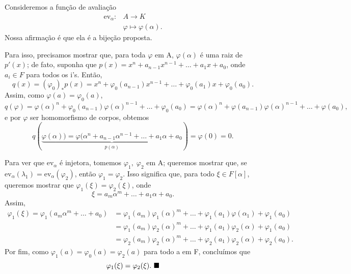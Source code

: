\documentclass[../algebraIII_notes.tex]{subfiles}
\begin{document}
\begin{proof*}
	Consideremos a função de avaliação
	\begin{align*}
		\mathrm{ev}_{\alpha }: & A\rightarrow K                        \\
		                       & \varphi \longmapsto \varphi(\alpha ).
	\end{align*}
	Nossa afirmação é que ela é a bijeção proposta.

	Para isso, precisamos mostrar que, para toda \(\varphi \) em A, \(\varphi(\alpha )\) é uma raiz de \(p'(x)\); de fato, suponha que \(p(x) = x^{n} + a_{n-1}x^{n-1}+\dotsc +a_1 x + a_{0}\), onde \(a_{i}\in F\) para todos os i's. Então,
	\[
		q(x) = (\varphi_{0})_{*}p(x) = x^{n} + \varphi_{0}(a_{n-1})x^{n-1}+\dotsc +\varphi_{0}(a_1)x + \varphi_{0}(a_{0}).
	\]
	Assim, como \(\varphi (a) = \varphi_{0}(a)\),
	\[
		q(\varphi)=\varphi(\alpha )^{n}+\varphi_{0}(a_{n-1})\varphi(\alpha)^{n-1}+\dotsc +\varphi_{0}(a_{0}) = \varphi(\alpha)^{n}+\varphi(a_{n-1})\varphi(\alpha)^{n-1}+\dotsc +\varphi(a_{0}),
	\]
	e por \(\varphi \) ser homomorfismo de corpos, obtemos
	\[
		q(\underbrace{\varphi (\alpha )) = \varphi (\alpha^{n}+a_{n-1}\alpha^{n-1}+\dotsc +a_{1}\alpha +a_{0}}_{p(\alpha )})=\varphi(0) = 0.
	\]

	Para ver que \(\mathrm{ev}_{\alpha }\) é injetora, tomemos \(\varphi_1,\; \varphi_2\) em A; queremos mostrar que, se \(\mathrm{ev}_{\alpha }(\lambda_1) = \mathrm{ev}_{\alpha }(\varphi_2)\), então \(\varphi_1 = \varphi_2\). Isso significa que, para todo \(\xi \in F[\alpha ]\), queremos mostrar que \(\varphi_1(\xi ) = \varphi_2(\xi )\), onde
	\[
		\xi = a_{m}\alpha^{m} + \dotsc +a_1 \alpha  + a_{0}.
	\]
	Assim,
	\begin{align*}
		\varphi_{1}(\xi ) = \varphi_{1}(a_{m}\alpha^{m}+\dotsc +a_{0}) & = \varphi_1(a_{m})\varphi_1(\alpha)^{m}+\dotsc +\varphi_1(a_1)\varphi(\alpha_1) + \varphi_1(a_{0}) \\
		                                                               & = \varphi_1(a_{m})\varphi_2(\alpha)^{m}+\dotsc + \varphi_1(a_1)\varphi_2(\alpha )+\varphi_1(a_{0}) \\
		                                                               & = \varphi_2(a_{m})\varphi_2(\alpha)^{m}+\dotsc +\varphi_2(a_1)\varphi_2(\alpha )+\varphi_2(a_{0}).
	\end{align*}
	Por fim, como \(\varphi_1(a) = \varphi_{0}(a) = \varphi_2(a)\) para todo a em F, concluímos que
	\[
		\varphi_1(\xi ) = \varphi_2(\xi ). \text{ $\blacksquare$}
	\]

\end{proof*}
\end{document}
